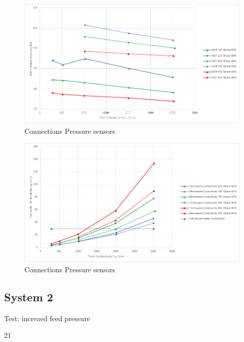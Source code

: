 \begin{figure}[H]
    \centering
    \includegraphics[width=1.1\textwidth]{NDP}
    \caption{Connections Pressure sensors}
    \label{fig:PressConn}
\end{figure}

\begin{figure}[H]
    \centering
    \includegraphics[width=1.1\textwidth]{PermCond}
    \caption{Connections Pressure sensors}
    \label{fig:PressConn}
\end{figure}





\subsection{System 2}

Test: increaed feed pressure

21


